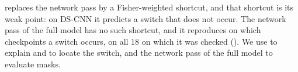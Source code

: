  replaces the network pass by a Fisher-weighted shortcut, and that shortcut is its weak point: on DS-CNN it predicts a switch that does not occur. The network pass of the full model has no such shortcut, and it reproduces on which checkpoints a switch occurs, on all 18 on which it was checked (). We use  to explain and to locate the switch, and the network pass of the full model to evaluate masks.
